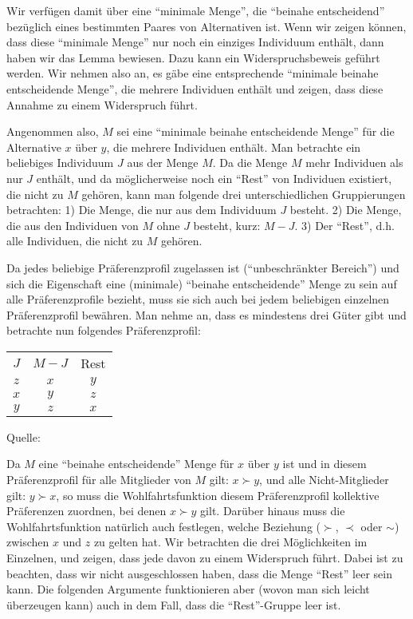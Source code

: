 Wir verfügen damit über eine "`minimale Menge"', die "`beinahe entscheidend"'
bezüglich eines bestimmten Paares von Alternativen ist. Wenn wir zeigen können,
dass diese "`minimale Menge"' nur noch ein einziges Individuum enthält,
dann haben wir das Lemma bewiesen. Dazu kann ein Widerspruchsbeweis geführt werden.
Wir nehmen also an, es gäbe eine entsprechende "`minimale beinahe entscheidende
Menge"', die mehrere Individuen enthält und zeigen, dass diese Annahme zu einem
Widerspruch führt.

Angenommen also, $M$ sei eine "`minimale beinahe entscheidende Menge"' für die
Alternative $x$ über $y$, die mehrere Individuen enthält. Man betrachte ein
beliebiges Individuum $J$ aus der Menge $M$. Da die Menge $M$ mehr Individuen als
nur $J$ enthält, und da möglicherweise noch ein "`Rest"' von
Individuen existiert, die nicht zu $M$ gehören, kann man folgende drei
unterschiedlichen Gruppierungen betrachten: 1) Die Menge, die nur aus dem 
Individuum $J$ besteht.
2) Die Menge, die aus den Individuen von $M$ ohne $J$ besteht, kurz: $M-J$. 3)
Der "`Rest"', d.h. alle Individuen, die nicht zu $M$ gehören.

Da jedes beliebige Präferenzprofil zugelassen ist ("`unbeschränkter Bereich"')
und sich die Eigenschaft eine (minimale) "`beinahe entscheidende"' Menge zu
sein auf alle Präferenzprofile bezieht, muss sie sich auch bei jedem beliebigen
einzelnen Präferenzprofil bewähren. Man nehme an, dass es mindestens
drei Güter gibt und betrachte nun folgendes Präferenzprofil:

\begin{center}
\begin{tabular}{ccc}
$J$ & $M-J$ & Rest \\
\cline{1-3}
$z$ & $x$ & $y$ \\
$x$ & $y$ & $z$ \\
$y$ & $z$ & $x$ \\
\end{tabular}

\vspace{0.5cm}
{\small Quelle: \cite[S. 188]{resnik:1987}}
\end{center}

Da $M$ eine "`beinahe entscheidende"' Menge für $x$ über $y$ ist und in diesem
Präferenzprofil für alle Mitglieder von $M$ gilt: $x \succ y$, und alle
Nicht-Mitglieder gilt: $y \succ x$, so muss die Wohlfahrtsfunktion diesem
Präferenzprofil kollektive Präferenzen zuordnen, bei denen $x \succ y$ gilt.
Darüber hinaus muss die Wohlfahrtsfunktion natürlich auch festlegen, welche
Beziehung ($\succ$, $\prec$ oder $\sim$) zwischen $x$ und $z$ zu gelten hat.
Wir betrachten die drei Möglichkeiten im Einzelnen, und zeigen, dass jede davon
zu einem Widerspruch führt. Dabei ist zu beachten, dass wir nicht
ausgeschlossen haben, dass die Menge "`Rest"' leer sein kann. Die folgenden
Argumente funktionieren aber (wovon man sich leicht überzeugen kann) auch
in dem Fall, dass die "`Rest"'-Gruppe leer ist.

